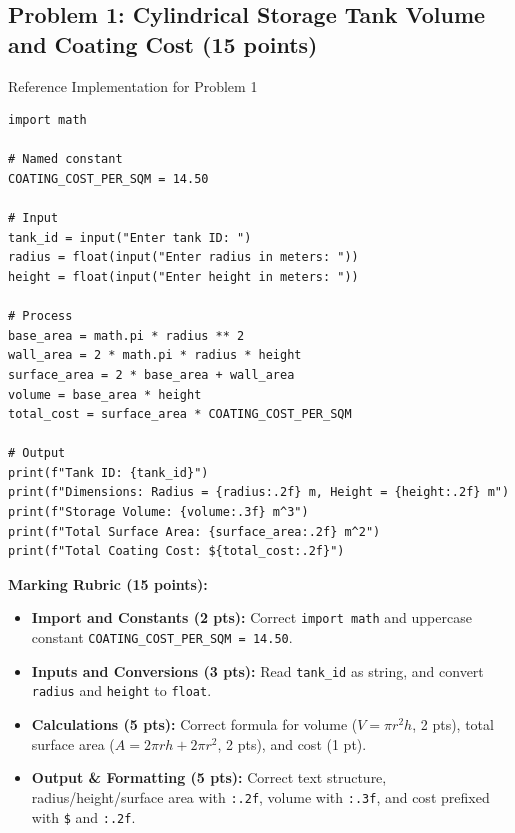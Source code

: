 \documentclass[11pt,a4paper]{article}
\begin{document}
\subsection*{Problem 1: Cylindrical Storage Tank Volume and Coating Cost (15 points)}
\begin{solbox}{Reference Implementation for Problem 1}
\begin{lstlisting}
import math

# Named constant
COATING_COST_PER_SQM = 14.50

# Input
tank_id = input("Enter tank ID: ")
radius = float(input("Enter radius in meters: "))
height = float(input("Enter height in meters: "))

# Process
base_area = math.pi * radius ** 2
wall_area = 2 * math.pi * radius * height
surface_area = 2 * base_area + wall_area
volume = base_area * height
total_cost = surface_area * COATING_COST_PER_SQM

# Output
print(f"Tank ID: {tank_id}")
print(f"Dimensions: Radius = {radius:.2f} m, Height = {height:.2f} m")
print(f"Storage Volume: {volume:.3f} m^3")
print(f"Total Surface Area: {surface_area:.2f} m^2")
print(f"Total Coating Cost: ${total_cost:.2f}")
\end{lstlisting}
\textbf{Marking Rubric (15 points):}
\begin{itemize}[leftmargin=2em]
  \item \textbf{Import and Constants (2 pts):} Correct \texttt{import math} and uppercase constant \texttt{COATING\_COST\_PER\_SQM = 14.50}.
  \item \textbf{Inputs and Conversions (3 pts):} Read \texttt{tank\_id} as string, and convert \texttt{radius} and \texttt{height} to \texttt{float}.
  \item \textbf{Calculations (5 pts):} Correct formula for volume ($V = \pi r^2 h$, 2 pts), total surface area ($A = 2\pi rh + 2\pi r^2$, 2 pts), and cost (1 pt).
  \item \textbf{Output \& Formatting (5 pts):} Correct text structure, radius/height/surface area with \texttt{:.2f}, volume with \texttt{:.3f}, and cost prefixed with \texttt{\$} and \texttt{:.2f}.
\end{itemize}
\end{solbox}
\end{document}
